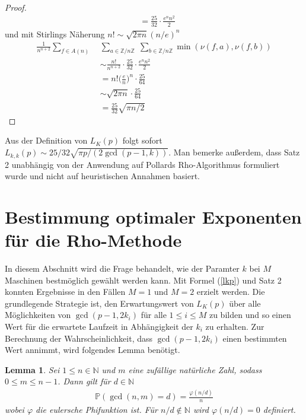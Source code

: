 \documentclass[a4paper, 10pt, ngerman]{article}
\newcommand{\N}{\mathbb{N}}
\newcommand{\Z}{\mathbb{Z}}
\newtheorem{lemma}{Lemma}
\begin{document}
\begin{proof}
\begin{align*}
         & = \frac {25} {32} \cdot \frac {e^n n^2} {2}
    \end{align*}
    und mit Stirlings Näherung $n! \sim \sqrt{2\pi n} (n/e)^n$
    \begin{align*}
        \frac 1 {n^{n + 2}} \sum_{f \in A(n)} \;
         & \sum_{a \in \Z/n\Z} \; \sum_{b \in \Z/n\Z} \min(\nu(f, a), \nu(f, b))    \\
         & \sim \frac {n!}{n^{n + 2}} \cdot \frac {25} {32} \cdot \frac {e^n n^2} 2 \\
         & = n! \bigg (\frac {e} {n} \bigg )^n \cdot \frac {25} {64}                \\
         & \sim \sqrt {2 \pi n} \cdot \frac {25}{64}                                \\
         & = \frac {25} {32} \sqrt{\pi n/2}
    \end{align*}
\end{proof}

\noindent Aus der Definition von $L_K(p)$ folgt sofort $L_{k, k}(p) \sim 25/32 \sqrt{\pi p / (2\gcd(p - 1, k))}$. Man bemerke außerdem, dass Satz 2 unabhängig von der Anwendung auf Pollards Rho-Algorithmus formuliert wurde und nicht auf heuristischen Annahmen basiert.

\section{Bestimmung optimaler Exponenten für die Rho-Methode}\label{sec:optk}

In diesem Abschnitt wird die Frage behandelt, wie der Paramter $k$ bei $M$ Maschinen bestmöglich gewählt werden kann. Mit Formel (\ref{lkp}) und Satz 2 konnten Ergebnisse in den Fällen $M = 1$ und $M = 2$ erzielt werden. Die grundlegende Strategie ist, den Erwartungswert von $L_K(p)$ über alle Möglichkeiten von $\gcd(p - 1, 2k_i)$ für alle $1 \le i \le M$ zu bilden und so einen Wert für die erwartete Laufzeit in Abhängigkeit der $k_i$ zu erhalten. Zur Berechnung der Wahrscheinlichkeit, dass $\gcd(p - 1, 2k_i)$ einen bestimmten Wert annimmt, wird folgendes Lemma benötigt.

\begin{lemma}
    Sei $1 \le n \in \N$ und $m$ eine zufällige natürliche Zahl, sodass $0 \le m \le n - 1$. Dann gilt für $d \in \N$
    \begin{align*}
        \mathbb{P}(\gcd(n, m) = d) = \frac {\varphi(n / d)} n
    \end{align*}
    wobei $\varphi$ die eulersche Phifunktion ist. Für $n/d \notin \N$ wird $\varphi(n/d) = 0$ definiert.
\end{lemma}
\end{document}
